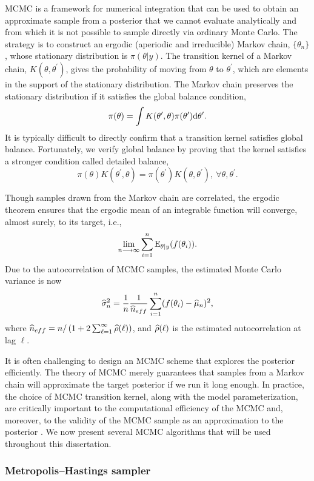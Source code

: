 MCMC is a framework for numerical integration that can be used to obtain an approximate sample from a posterior that we cannot evaluate analytically and from which it is not possible to sample directly via ordinary Monte Carlo. The strategy is to construct an ergodic (aperiodic and irreducible) Markov chain, $ \lbrace \theta_n\rbrace $, whose stationary distribution is $ \pi(\theta|y) $. The transition kernel of a Markov chain, $ K(\theta,\theta^\prime) $, gives the probability of moving from $ \theta $ to $ \theta^\prime $, which are elements in the support of the stationary distribution. The Markov chain preserves the stationary distribution if it satisfies the global balance condition,
$$\pi(\theta) = \int K(\theta^\prime,\theta)\pi(\theta^\prime)\mathrm{d} \theta^\prime.$$
It is typically difficult to directly confirm that a transition kernel satisfies global balance. Fortunately, we verify global balance by proving that the kernel satisfies a stronger condition called detailed balance,
$$\pi(\theta)K(\theta^\prime,\theta) = \pi(\theta^\prime)K(\theta,\theta^\prime),\ \forall \theta,\theta^\prime.$$

Though samples drawn from the Markov chain are correlated, the ergodic theorem ensures that the ergodic mean of an integrable function will converge, almost surely, to its target, i.e.,
$$\lim\limits_{n\longrightarrow\infty}\sum_{i=1}^n\mathrm{E}_{\theta|y}(f(\theta_i)).$$
Due to the autocorrelation of MCMC samples, the estimated Monte Carlo variance is now 
$$\widehat{\sigma}_n^2 = \frac{1}{n}\frac{1}{\widehat{n}_{eff}}\sum_{i=1}^n(f(\theta_i) - \widehat{\mu}_n)^2,$$
where $ \widehat{n}_{eff} = n / \left (1 + 2\sum_{\ell=1}^{\infty}\widehat{\rho}(\ell)\right ) $, and $ \widehat{\rho}(\ell) $ is the estimated autocorrelation at lag $ \ell $. 

It is often challenging to design an MCMC scheme that explores the posterior efficiently. The theory of MCMC merely guarantees that samples from a Markov chain will approximate the target posterior if we run it long enough. In practice, the choice of MCMC transition kernel, along with the model parameterization, are critically important to the computational efficiency of the MCMC and, moreover, to the validity of the MCMC sample as an approximation to the posterior \cite{betancourt2017conceptual}. We now present several MCMC algorithms that will be used throughout this dissertation. 

\subsubsection{Metropolis--Hastings sampler}
\label{subsubsec:metropolis_hastings}

